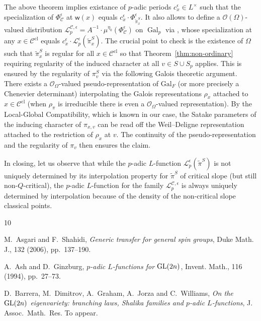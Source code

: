 \documentclass{amsart}
\theoremstyle{definition}
\newcommand{\cL}{\mathcal{L}}
\newcommand{\Gal}{\operatorname{Gal}}
\begin{document}
{ 
 The above theorem implies existance of $p$-adic periods $c_x^{\epsilon}\in L^\times$ such that the  specialization of $\Phi_{\mathcal{C}}^\epsilon$ at $\mathsf{w}(x)$ equals $c_x^{\epsilon}\cdot \Phi_{\tilde\pi_x^S}^\epsilon$. It also allows to define a $\mathcal{O}(\Omega)$-valued distribution 
 $\mathcal{L}_p^{\mathcal{C},\epsilon} = A^{-1}\cdot  \mu^{\eta_0}(\Phi_{\mathcal{C}}^\epsilon)$ on $\Gal_p$ via \cite[Def.~6.17]{BDW}, 
 whose specialization at any  $x\in  \mathcal{C}^{\mathrm{cl}}$ equals $c_x^{\epsilon}\cdot \cL^\epsilon_p(\tilde{\pi}_x^S)$. 
The crucial point to check is the existence of  $\Omega$  such that  $\tilde\pi_x^S$ is  regular  for all $x\in \mathcal{C}^{\mathrm{cl}}$ so that 
Theorem~\ref{thm:non-ordinary} requiring regularity of the induced character at all  $v\in S\cup S_p$ applies. 
This is ensured by the regularity of $\pi_v^S$ via the following Galois theoretic argument. There exists a $\mathcal{O}_\Omega$-valued pseudo-representation of $\mathrm{Gal}_F$ (or more precisely a Chenevier determinant) interpolating the Galois representations $\rho_x$ attached to  $x\in  \mathcal{C}^{\mathrm{cl}}$ (when $\rho_\pi$ is irreducible there is even a $\mathcal{O}_\Omega$-valued representation). 
By the Local-Global Compatibility, which is  known in our case, the Satake parameters of the inducing character of $\pi_{x,v}$ can be read off the Weil--Deligne representation attached to the restriction of $\rho_x$ at $v$. The continuity of the pseudo-representation and the 
 regularity of $\pi_v$ then ensures the claim. 

In closing, let us observe that while the $p$-adic $L$-function   $\cL^\epsilon_p(\tilde{\pi}^S)$ is not uniquely determined by its interpolation property 
  for  $\tilde\pi^S$ of critical slope (but still non-$Q$-critical), the $p$-adic $L$-function for the family  $\mathcal{L}_p^{\mathcal{C},\epsilon}$ is 
  always uniquely determined by  interpolation because of the density of the  non-critical slope classical points. 	

\begin{thebibliography}{10}


{\sc M.~Asgari and F.~Shahidi}, {\em Generic transfer for general spin groups},
  Duke Math. J., 132 (2006), pp.~137--190.

{\sc A.~Ash and D.~Ginzburg}, {\em {$p$}-adic {$L$}-functions for {${\rm
  GL}(2n)$}}, Invent. Math., 116 (1994), pp.~27--73.

{\sc D.~Barrera, M.~Dimitrov, A.~Graham, A.~Jorza and C.~Williams},
  {\em On the ${\rm GL}(2n)$ eigenvariety: branching laws, {S}halika families and
  $p$-adic ${L}$-functions}, J. Assoc.\ Math.\ Res.
\newblock To appear.



\end{thebibliography}}
\end{document}

